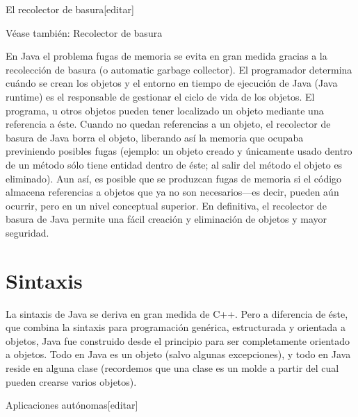 \documentclass[11pt,a4paper]{$type}
\begin{document}
	\bigskip
							El recolector de basura[editar]
	\bigskip
							
	\bigskip
							Véase también: Recolector de basura
	\bigskip
							
	\bigskip
							En Java el problema fugas de memoria se evita en gran medida gracias a la recolección de basura (o automatic garbage collector). El programador determina cuándo se crean los objetos y el entorno en tiempo de ejecución de Java (Java runtime) es el responsable de gestionar el ciclo de vida de los objetos. El programa, u otros objetos pueden tener localizado un objeto mediante una referencia a éste. Cuando no quedan referencias a un objeto, el recolector de basura de Java borra el objeto, liberando así la memoria que ocupaba previniendo posibles fugas (ejemplo: un objeto creado y únicamente usado dentro de un método sólo tiene entidad dentro de éste; al salir del método el objeto es eliminado). Aun así, es posible que se produzcan fugas de memoria si el código almacena referencias a objetos que ya no son necesarios—es decir, pueden aún ocurrir, pero en un nivel conceptual superior. En definitiva, el recolector de basura de Java permite una fácil creación y eliminación de objetos y mayor seguridad.
	\bigskip
			
			\chapter{Sintaxis}
												La sintaxis de Java se deriva en gran medida de C++. Pero a diferencia de éste, que combina la sintaxis para programación genérica, estructurada y orientada a objetos, Java fue construido desde el principio para ser completamente orientado a objetos. Todo en Java es un objeto (salvo algunas excepciones), y todo en Java reside en alguna clase (recordemos que una clase es un molde a partir del cual pueden crearse varios objetos).
	\bigskip
							
	\bigskip
							Aplicaciones autónomas[editar]
	\bigskip
							
\end{document}
